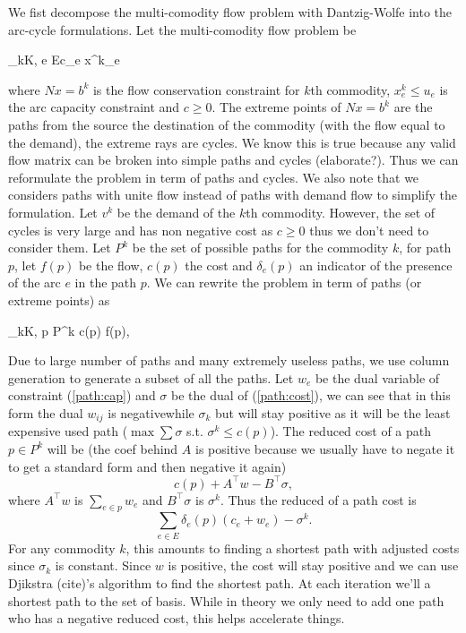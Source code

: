 \documentclass{article}
\begin{document}
 	
 	We fist decompose the multi-comodity flow problem with Dantzig-Wolfe into the arc-cycle formulations. Let the multi-comodity flow problem be 
 	\begin{mini!}{}{\sum_{k\in K, e \in E}c_e x^k_e}{}{}
 	\end{mini!}
 	where $Nx=b^k$ is the flow conservation constraint for $k$th commodity, $x^k_e \leq u_e$ is the arc capacity constraint and $c \geq 0$. The extreme points of $Nx=b^k$ are the paths from the source the destination of the commodity (with the flow equal to the demand), the extreme rays are cycles. We know this is true because any valid flow matrix can be broken into simple paths and cycles (elaborate?). Thus we can reformulate the problem in term of paths and cycles. We also note that we considers paths with unite flow instead of paths with demand flow to simplify the formulation. Let $v^k$ be the demand of the $k$th commodity. However, the set of cycles is very large and has non negative cost as $c \geq 0$ thus we don't need to consider them. Let $P^k$ be the set of possible paths for the commodity $k$, for path $p$, let $f(p)$ be the flow, $c(p)$ the cost and $\delta_e(p)$ an indicator of the presence of the arc $e$ in the path $p$. We can rewrite the problem in term of paths (or extreme points) as
 	\begin{mini!}{}{\sum_{k\in K, p \in P^k} c(p) f(p),}{}{}
 	\end{mini!}
	Due to large number of paths and many extremely useless paths, we use column generation to generate a subset of all the paths. Let $w_e$ be the dual variable of constraint (\ref{path:cap}) and $\sigma$ be the dual of (\ref{path:cost}), we can see that in this form the dual $w_{ij}$ is negativewhile $\sigma_k$ but will stay positive as it will be the least expensive used path ($\max \sum\sigma$ s.t. $\sigma^k \leq c(p)$). The reduced cost of a path $p \in P^k$ will be (the coef behind $A$ is positive because we usually have to negate it to get a standard form and then negative it again)
	\begin{equation}
		c(p) + A^\top w - B^\top \sigma,
	\end{equation} 
	where $A^\top w$ is $\sum_{e \in p} w_e$ and $B^\top\sigma$ is $\sigma^k$. Thus the reduced of a path cost is
	\begin{equation}
		\sum_{e \in E} \delta_e(p) (c_e + w_e) - \sigma^k.
	\end{equation}
	For any commodity $k$, this amounts to finding a shortest path with adjusted costs since $\sigma_k$ is constant. Since $w$ is positive, the cost will stay positive and we can use Djikstra (cite)'s algorithm to find the shortest path. At each iteration we'll a shortest path to the set of basis. While in theory we only need to add one path who has a negative reduced cost, this helps accelerate things.
	
\end{document}
